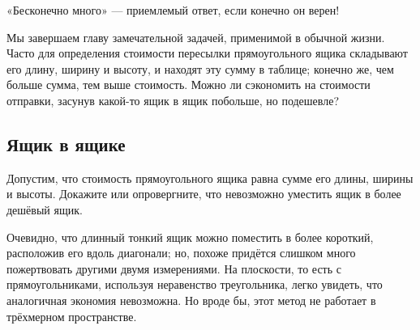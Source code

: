  «Бесконечно много» --- приемлемый ответ, если конечно он верен!

\medskip

Мы завершаем главу замечательной задачей, применимой в обычной жизни.
Часто для определения стоимости пересылки прямоугольного ящика складывают его длину, ширину и высоту,
и находят эту сумму в таблице;
конечно же, чем больше сумма, тем выше стоимость.
Можно ли сэкономить на стоимости отправки, засунув какой-то ящик в ящик побольше, но подешевле?

\subsection*{Ящик в ящике}

Допустим, что стоимость прямоугольного ящика равна сумме его длины, ширины и высоты.
Докажите или опровергните, что невозможно уместить ящик в более дешёвый ящик.

Очевидно, что длинный тонкий ящик можно поместить в более короткий, расположив его вдоль диагонали;
но, похоже придётся слишком много пожертвовать другими двумя измерениями.
На плоскости, то есть с прямоугольниками, используя неравенство треугольника, легко увидеть, что аналогичная экономия невозможна.
Но вроде бы, этот метод не работает в трёхмерном пространстве.
